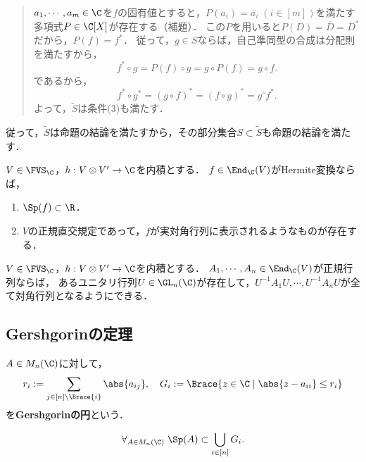 \documentclass[uplatex,dvipdfmx]{jsarticle}
\begin{document}
\begin{Proof}
\begin{description}
\begin{quotation}
            $a_1,\cdots,a_m\in\C$を$f$の固有値とすると，$P(a_i)=\overline{a_i}\;(i\in[m])$を満たす多項式$P\in\C[X]$が存在する（補題）．
            この$P$を用いると$P(D)=\overline{D}=D^*$だから，$P(f)=f^*$．
            従って，$g\in S$ならば，自己準同型の合成は分配則を満たすから，
            \[f^*\circ g=P(f)\circ g=g\circ P(f)=g\circ f.\]
            であるから，
            \[f^*\circ g^*=(g\circ f)^*=(f\circ g)^*=g^\circ f^*.\]
            よって，$\tilde{S}$は条件(3)も満たす．
        \end{quotation}
        従って，$\tilde{S}$は命題の結論を満たすから，その部分集合$S\subset\tilde{S}$も命題の結論を満たす．
    \end{description}
\end{Proof}

\begin{corollary}[Hermite変換は実多角化可能]
    $V\in\FVS_\C$，$h:V\otimes V'\to\C$を内積とする．
    $f\in\End_\C(V)$がHermite変換ならば，
    \begin{enumerate}
        \item $\Sp(f)\subset\R$．
        \item $V$の正規直交規定であって，$f$が実対角行列に表示されるようなものが存在する．
    \end{enumerate}
\end{corollary}

\begin{corollary}[正規行列は一斉対角化可能]
    $V\in\FVS_\C$，$h:V\otimes V'\to\C$を内積とする．
    $A_1,\cdots,A_n\in\End_\C(V)$が正規行列ならば，
    あるユニタリ行列$U\in\GL_n(\C)$が存在して，$U^{-1}A_1U,\cdots,U^{-1}A_nU$が全て対角行列となるようにできる．
\end{corollary}

\subsection{Gershgorinの定理}

\begin{definition}
    $A\in M_n(\C)$に対して，
    \[r_i:=\sum_{j\in[n]\setminus\Brace{i}}\abs{a_{ij}},\quad G_i:=\Brace{z\in\C\mid\abs{z-a_{ii}}\le r_i}\]
    を\textbf{Gershgorinの円}という．
\end{definition}

\begin{theorem}[Gershgorin]\label{thm-Gershgorin}
    \[\forall_{A\in M_n(\C)}\;\Sp(A)\subset \bigcup_{i\in[n]}G_i.\]
\end{theorem}
\end{document}

